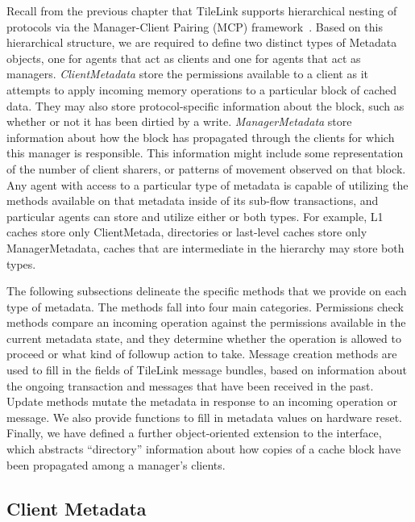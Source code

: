 Recall from the previous chapter that TileLink supports hierarchical nesting of protocols via the Manager-Client Pairing (MCP) framework~\cite{beu2011manager}.
Based on this hierarchical structure, we are required to define two distinct types of Metadata objects,
one for agents that act as clients and one for agents that act as managers.
\emph{ClientMetadata} store the permissions available to a client as it attempts to 
apply incoming memory operations to a particular block of cached data.
They may also store protocol-specific information about the block, such as whether or not it has been dirtied by a write.
\emph{ManagerMetadata} store information about how the block has propagated through the clients for which this manager is responsible.
This information might include some representation of the number of client sharers, or patterns of movement observed on that block.
Any agent with access to a particular type of metadata is capable of utilizing the methods
available on that metadata inside of its sub-flow transactions,
and particular agents can store and utilize either or both types.
For example, L1 caches store only ClientMetada, directories or last-level caches store only ManagerMetadata,
caches that are intermediate in the hierarchy may store both types.

The following subsections delineate the specific methods that we provide on each type of metadata.
The methods fall into four main categories.
Permissions check methods compare an incoming operation against the permissions available in the current metadata state,
and they determine whether the operation is allowed to proceed or what kind of followup action to take.
Message creation methods are used to fill in the fields of TileLink message bundles, based on information about the ongoing transaction
and messages that have been received in the past.
Update methods mutate the metadata in response to an incoming operation or message.
We also provide functions to fill in metadata values on hardware reset.
Finally, we have defined a further object-oriented extension to the interface, which abstracts ``directory'' information about how copies of
a cache block have been propagated among a manager's clients.

\subsection{Client Metadata} 

